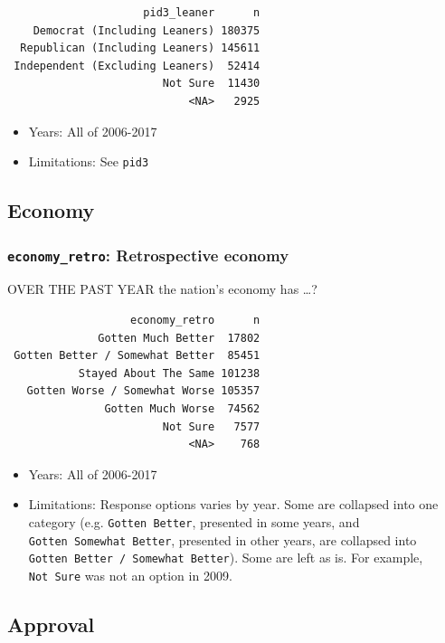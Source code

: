 \documentclass[10pt,article,oneside]{memoir}
\theoremstyle{definition}
\begin{document}
\begin{verbatim}
                     pid3_leaner      n
    Democrat (Including Leaners) 180375
  Republican (Including Leaners) 145611
 Independent (Excluding Leaners)  52414
                        Not Sure  11430
                            <NA>   2925
\end{verbatim}

\begin{itemize}
\tightlist
\item
  Years: All of 2006-2017
\item
  Limitations: See \texttt{pid3}
\end{itemize}

\subsection{Economy}\label{economy}

\subsubsection{\texorpdfstring{\texttt{economy\_retro}: Retrospective
economy}{economy\_retro: Retrospective economy}}\label{economy_retro-retrospective-economy}

OVER THE PAST YEAR the nation's economy has \ldots{}?

\begin{verbatim}
                   economy_retro      n
              Gotten Much Better  17802
 Gotten Better / Somewhat Better  85451
           Stayed About The Same 101238
   Gotten Worse / Somewhat Worse 105357
               Gotten Much Worse  74562
                        Not Sure   7577
                            <NA>    768
\end{verbatim}

\begin{itemize}
\tightlist
\item
  Years: All of 2006-2017
\item
  Limitations: Response options varies by year. Some are collapsed into
  one category (e.g. \texttt{Gotten\ Better}, presented in some years,
  and \texttt{Gotten\ Somewhat\ Better}, presented in other years, are
  collapsed into \texttt{Gotten\ Better\ /\ Somewhat\ Better}). Some are
  left as is. For example, \texttt{Not\ Sure} was not an option in 2009.
\end{itemize}

\subsection{Approval}\label{approval}
\end{document}

